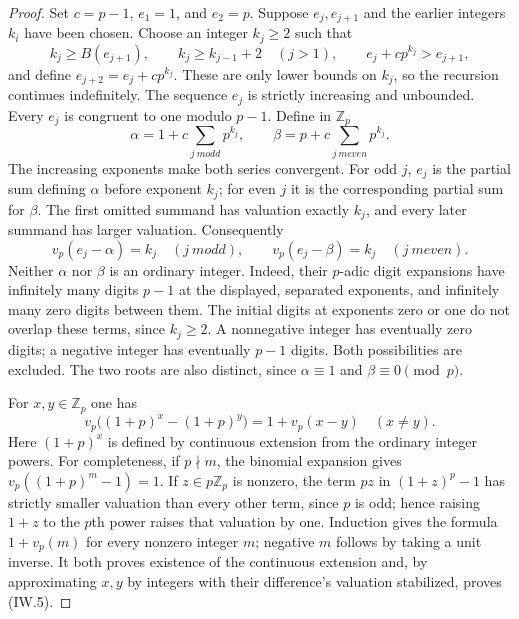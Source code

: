 \begin{proof}
Set $c=p-1$, $e_1=1$, and $e_2=p$.  Suppose $e_j,e_{j+1}$
and the earlier integers $k_i$ have been chosen.
Choose an integer $k_j\ge2$ such that
\[
 k_j\ge B(e_{j+1}),\qquad
 k_j\ge k_{j-1}+2\quad(j>1),\qquad
 e_j+c p^{k_j}>e_{j+1},
\]
and define $e_{j+2}=e_j+c p^{k_j}$.
These are only lower bounds on $k_j$, so the recursion continues
indefinitely.  The sequence $e_j$ is strictly increasing and
unbounded.  Every $e_j$ is congruent to one modulo $p-1$.
Define in $\mathbb Z_p$
\[
 \alpha=1+c\sum_{j\ {
m odd}}p^{k_j},\qquad
 \beta=p+c\sum_{j\ {
m even}}p^{k_j}.             \tag{IW.3}
\]
The increasing exponents make both series convergent.
For odd $j$, $e_j$ is the partial sum defining $\alpha$
before exponent $k_j$; for even $j$ it is the corresponding
partial sum for $\beta$.  The first omitted summand has
valuation exactly $k_j$, and every later summand has larger
valuation.  Consequently
\[
 v_p(e_j-\alpha)=k_j\quad(j\ {
m odd}),\qquad
 v_p(e_j-\beta)=k_j\quad(j\ {
m even}).          \tag{IW.4}
\]
Neither $\alpha$ nor $\beta$ is an ordinary integer.
Indeed, their $p$-adic digit expansions have infinitely many
digits $p-1$ at the displayed, separated exponents, and
infinitely many zero digits between them.  The initial digits
at exponents zero or one do not overlap these terms, since
$k_j\ge2$.  A nonnegative integer has eventually zero digits;
a negative integer has eventually $p-1$ digits.  Both
possibilities are excluded.  The two roots are also distinct,
since $\alpha\equiv1$ and $\beta\equiv0\pmod p$.

For $x,y\in\mathbb Z_p$ one has
\[
 v_p\bigl((1+p)^x-(1+p)^y\bigr)
                         =1+v_p(x-y)\quad(x\ne y).
                                                        \tag{IW.5}
\]
Here $(1+p)^x$ is defined by continuous extension from the
ordinary integer powers.  For completeness, if $p\nmid m$,
the binomial expansion gives
$v_p((1+p)^m-1)=1$.  If $z\in p\mathbb Z_p$ is nonzero,
the term $pz$ in $(1+z)^p-1$ has strictly smaller valuation
than every other term, since $p$ is odd; hence raising
$1+z$ to the $p$th power raises that valuation by one.
Induction gives the formula $1+v_p(m)$ for every nonzero
integer $m$; negative $m$ follows by taking a unit inverse.
It both proves existence of the continuous extension and,
by approximating $x,y$ by integers with their difference's
valuation stabilized, proves (IW.5).


\end{proof}
